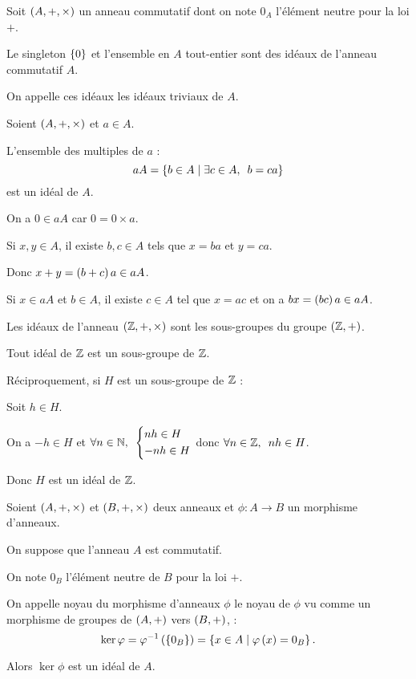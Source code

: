\begin{ex}
Soit \(\anneau{A}\) un anneau commutatif dont on note \(0_A\) l'élément neutre pour la loi \(+\).

Le singleton \(\left\lbrace0\right\rbrace\) et l'ensemble en \(A\) tout-entier sont des idéaux de l'anneau commutatif \(A\).

On appelle ces idéaux les idéaux triviaux de \(A\).
\end{ex}

\begin{ex}
Soient \(\anneau{A}\) et \(a\in A\).

L'ensemble des multiples de \(a\) : \[aA=\accol{b\in A\tq\quantifs{\exists c\in A}b=ca}\] est un idéal de \(A\).
\end{ex}

\begin{dem}
On a \(0\in aA\) car \(0=0\times a\).

Si \(x,y\in A\), il existe \(b,c\in A\) tels que \(x=ba\) et \(y=ca\).

Donc \(x+y=\left(b+c\right)a\in aA\).

Si \(x\in aA\) et \(b\in A\), il existe \(c\in A\) tel que \(x=ac\) et on a \(bx=\left(bc\right)a\in aA\).
\end{dem}

\begin{ex}
Les idéaux de l'anneau \(\anneau{\Z}\) sont les sous-groupes du groupe \(\groupe{\Z}\).
\end{ex}

\begin{dem}
Tout idéal de \(\mathbb{Z}\) est un sous-groupe de \(\mathbb{Z}\).

Réciproquement, si \(H\) est un sous-groupe de \(\mathbb{Z}\) :

Soit \(h\in H\).

On a \(-h\in H\) et \(\quantifs{\forall n\in\N}\begin{dcases}nh\in H \\ -nh\in H\end{dcases}\) donc \(\quantifs{\forall n\in\Z}nh\in H\).

Donc \(H\) est un idéal de \(\mathbb{Z}\).
\end{dem}

\begin{ex}
Soient \(\anneau{A}\) et \(\anneau{B}\) deux anneaux et \(\phi:A\to B\) un morphisme d'anneaux.

On suppose que l'anneau \(A\) est commutatif.

On note \(0_B\) l'élément neutre de \(B\) pour la loi \(+\).

On appelle noyau du morphisme d'anneaux \(\phi\) le noyau de \(\phi\) vu comme un morphisme de groupes de \(\groupe{A}\) vers \(\groupe{B}\), \cad : \[\ker\varphi=\varphi^{-1}\left(\left\lbrace0_B\right\rbrace\right)=\left\lbrace x\in A\;\middle|\;\varphi\left(x\right)=0_B\right\rbrace.\]

Alors \(\ker\phi\) est un idéal de \(A\).
\end{ex}

